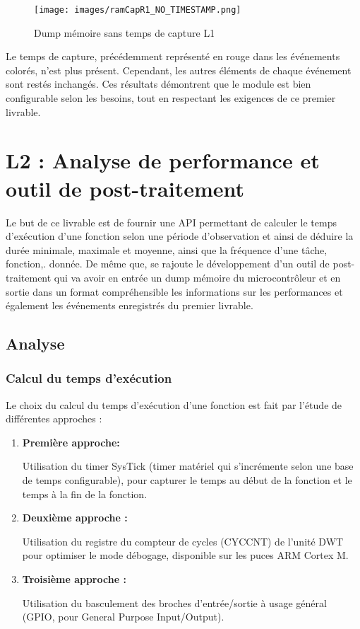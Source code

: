 \documentclass[a4paper, 12pt]{report}
\begin{document}
  \begin{figure}[H]
       \centering
       \texttt{[image: images/ramCapR1\_NO\_TIMESTAMP.png]}
       \caption{Dump mémoire sans temps de capture L1}
       \label{fig:dumpMemL1}
   \end{figure}

Le temps de capture, précédemment représenté en rouge dans les événements colorés, n'est plus présent. Cependant, les autres éléments de chaque événement sont restés inchangés. Ces résultats démontrent que le module est bien configurable selon les besoins, tout en respectant les exigences de ce premier livrable.

\section{L2 : Analyse de performance et outil de post-traitement}
Le but de ce livrable est de fournir une API permettant de calculer le temps d'exécution d'une fonction selon une période d'observation et ainsi de déduire la durée minimale, maximale et moyenne, ainsi que la fréquence d'une tâche, fonction,. donnée. De même que, se rajoute le développement d'un outil de post-traitement qui va avoir en entrée un dump mémoire du microcontrôleur et en sortie dans un format compréhensible les informations sur les performances et également les événements enregistrés du premier livrable.

\subsection{Analyse}
\subsubsection{Calcul du temps d'exécution}
Le choix du calcul du temps d'exécution d'une fonction est fait par l'étude de différentes approches :
\begin{enumerate}
    


\item \textbf{Première approche:}

Utilisation du timer SysTick (timer matériel qui s'incrémente selon une base de temps configurable), pour capturer le temps au début de la fonction et le temps à la fin de la fonction.


\item \textbf{Deuxième approche :}

Utilisation du registre du compteur de cycles (CYCCNT) de l'unité \ac{DWT} pour optimiser le  mode débogage, disponible sur les puces ARM Cortex M.
\clearpage

\item \textbf{Troisième approche :}

Utilisation du basculement des broches d'entrée/sortie à usage général (\acs{GPIO}, pour General Purpose Input/Output).

\end{enumerate}
\\
\end{document}
